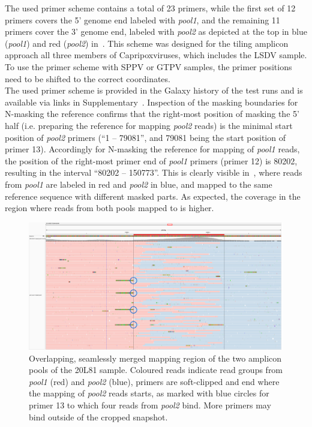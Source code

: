 The used primer scheme contains a total of 23 primers, while the first set of 12 primers covers the 5' genome end labeled with \textit{pool1}, and the remaining 11 primers cover the 3' genome end, labeled with \textit{pool2} as depicted at the top in blue (\textit{pool1}) and red (\textit{pool2}) in~. This scheme was designed for the tiling amplicon approach all three members of Capripoxviruses, which includes the \ac{LSDV} sample. To use the primer scheme with \ac{SPPV} or \ac{GTPV} samples, the primer positions need to be shifted to the correct coordinates.\\
The used primer scheme is provided in the Galaxy history of the test runs and is available via links in Supplementary~. Inspection of the masking boundaries for N-masking the reference confirms that the right-most position of masking the 5' half (i.e. preparing the reference for mapping \textit{pool2} reads) is the minimal start position of \textit{pool2} primers (``1 -- 79081'', and 79081 being the start position of primer 13). Accordingly for N-masking the reference for mapping of \textit{pool1} reads, the position of the right-most primer end of \textit{pool1} primers (primer 12) is 80202, resulting in the interval ``80202 -- 150773''. This is clearly visible in~, where reads from \textit{pool1} are labeled in red and \textit{pool2} in blue, and mapped to the same reference sequence with different masked parts. As expected, the coverage in the region where reads from both pools mapped to is higher.\\
\begin{figure}[ht!]
    \centering
    \hspace*{-24pt}
    \includegraphics[width=1.1\textwidth]{media/4-lsdv-alig-20L81-c.png}
    \caption[Overlapping reads region of LSDV mapping in 20L81 sample.]{Overlapping, seamlessly merged mapping region of the two amplicon pools of the 20L81 sample. Coloured reads indicate read groups from \textit{pool1} (red) and \textit{pool2} (blue), primers are soft-clipped and end where the mapping of \textit{pool2} reads starts, as marked with blue circles for primer 13 to which four reads from \textit{pool2} bind. More primers may bind outside of the cropped snapshot.}
    \label{fig:4-lsdv-read-groups}
\end{figure}

